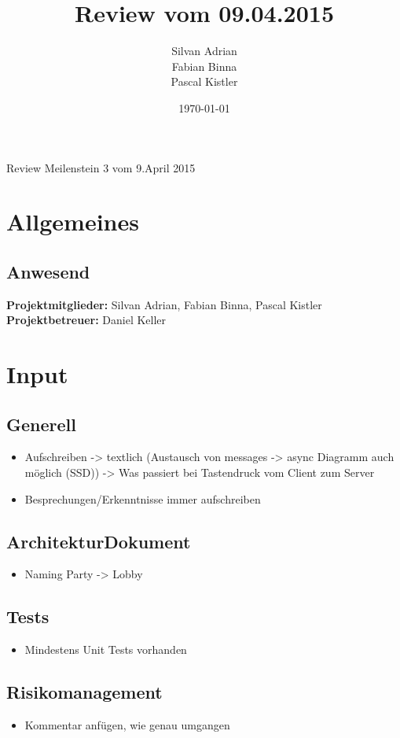 \documentclass[11pt]{scrartcl}
\title{Review vom 09.04.2015}
\author{Silvan Adrian \\ Fabian Binna \\ Pascal Kistler}
\date{\today{}}
\begin{document}
{\huge Review Meilenstein 3 vom 9.April 2015}

\section{Allgemeines}
\label{sec:Allgemein}

\subsection{Anwesend}
\label{sec:Anwesend}
\textbf{Projektmitglieder:} Silvan Adrian, Fabian Binna, Pascal Kistler \\
\textbf{Projektbetreuer:} Daniel Keller
\section{Input}
\subsection{Generell}
\begin{itemize}
  \item Aufschreiben -> textlich (Austausch von messages -> 
  async Diagramm auch möglich (SSD))
-> Was passiert bei Tastendruck vom Client zum Server
  \item Besprechungen/Erkenntnisse immer aufschreiben
\end{itemize}

\subsection{ArchitekturDokument}
\begin{itemize}
  \item Naming Party -> Lobby
\end{itemize}

\subsection{Tests}
\begin{itemize}
   \item Mindestens Unit Tests vorhanden
\end{itemize}

\subsection{Risikomanagement}
\begin{itemize}
  \item Kommentar anfügen, wie genau umgangen
\end{itemize}
\end{document}
